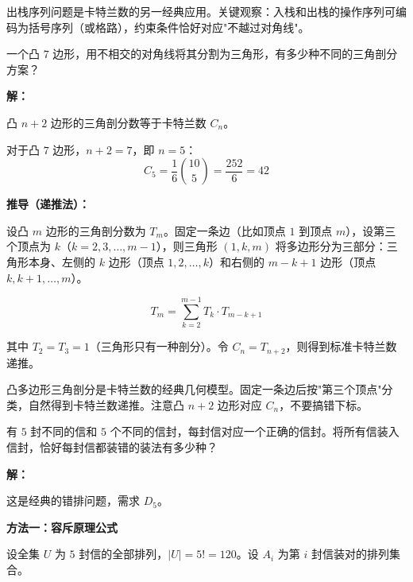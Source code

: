 \documentclass[12pt, a4paper]{ctexart}
\begin{document}
\begin{tipbox}[方法总结]
出栈序列问题是卡特兰数的另一经典应用。关键观察：入栈和出栈的操作序列可编码为括号序列（或格路），约束条件恰好对应"不越过对角线"。
\end{tipbox}

\vspace{6pt}

\begin{examplebox}
一个凸 \(7\) 边形，用不相交的对角线将其分割为三角形，有多少种不同的三角剖分方案？
\end{examplebox}

\textbf{解：}

凸 \(n+2\) 边形的三角剖分数等于卡特兰数 \(C_n\)。

对于凸 \(7\) 边形，\(n+2=7\)，即 \(n=5\)：
\[
C_5 = \frac{1}{6}\binom{10}{5} = \frac{252}{6} = \boxed{42}
\]

\textbf{推导（递推法）：}

设凸 \(m\) 边形的三角剖分数为 \(T_m\)。固定一条边（比如顶点 \(1\) 到顶点 \(m\)），设第三个顶点为 \(k\)（\(k=2,3,\ldots,m-1\)），则三角形 \((1,k,m)\) 将多边形分为三部分：三角形本身、左侧的 \(k\) 边形（顶点 \(1,2,\ldots,k\)）和右侧的 \(m-k+1\) 边形（顶点 \(k,k+1,\ldots,m\)）。

\[
T_m = \sum_{k=2}^{m-1} T_{k} \cdot T_{m-k+1}
\]

其中 \(T_2 = T_3 = 1\)（三角形只有一种剖分）。令 \(C_n = T_{n+2}\)，则得到标准卡特兰数递推。

\begin{tipbox}[方法总结]
凸多边形三角剖分是卡特兰数的经典几何模型。固定一条边后按"第三个顶点"分类，自然得到卡特兰数递推。注意凸 \(n+2\) 边形对应 \(C_n\)，不要搞错下标。
\end{tipbox}

\vspace{6pt}

\begin{examplebox}[【例题11】错排问题]
有 \(5\) 封不同的信和 \(5\) 个不同的信封，每封信对应一个正确的信封。将所有信装入信封，恰好每封信都装错的装法有多少种？
\end{examplebox}

\textbf{解：}

这是经典的错排问题，需求 \(D_5\)。

\textbf{方法一：容斥原理公式}

设全集 \(U\) 为 \(5\) 封信的全部排列，\(|U|=5!=120\)。设 \(A_i\) 为第 \(i\) 封信装对的排列集合。
\end{document}
